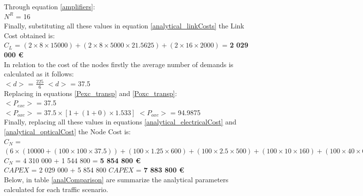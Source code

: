 Through equation \ref{amplifiers}:\\

$N^R$ = 16\\

Finally, substituting all these values in equation \ref{analytical_linkCosts} the Link Cost obtained is:\\

$C_L$ = $(2 \times 8 \times 15 000) + (2 \times 8 \times 5 000 \times 21.5625) + (2 \times 16 \times 2000)$ = \textbf{2 029 000 \euro}\\

In relation to the cost of the nodes firstly the average number of demands is calculated as it follows:\\

$<d>$ = $\frac{225}{6}$ \qquad \qquad $<d>$ = 37.5\\

Replacing in equations \ref{Pexc_transp} and \ref{Poxc_transp}:\\

$<P_{exc}>$ = 37.5\\

$<P_{oxc}>$ = $37.5 \times [1 + (1 + 0 ) \times 1.533]$ \qquad \quad $<P_{oxc}>$ = 94.9875 \\

Finally, replacing all these values in equations \ref{analytical_electricalCost} and \ref{analytical_opticalCost} the Node Cost is:\\


$C_N$ = $(6 \times (10 000 + (1 00 \times 100 \times 37.5)) + (100 \times 1.25 \times 600) + (100 \times 2.5 \times 500) + (100 \times 10 \times 160) + (100 \times 40 \times 60) + (100 \times 100 \times 40)) + (6 \times (20 000 + (2 500 \times 94.9875 )))$\\

$C_N$ = 4 310 000 + 1 544 800 = \textbf{5 854 800 \euro}\\

$CAPEX$ = 2 029 000 + 5 854 800 \qquad \qquad $CAPEX$ = \textbf{7 883 800 \euro}\\

Below, in table \ref{analComparison} are summarize the analytical parameters calculated for each traffic scenario.


